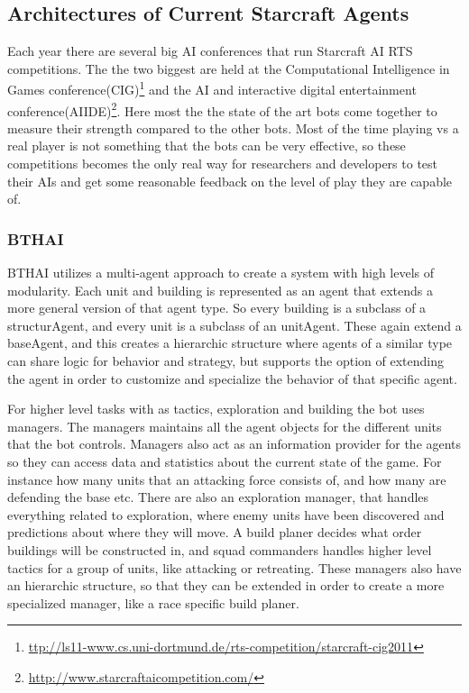 \subsection{Architectures of Current Starcraft Agents}
Each year there are several big AI conferences that run Starcraft AI RTS competitions. The the two biggest are held at the Computational Intelligence in Games conference(CIG)\footnote{\url{ttp://ls11-www.cs.uni-dortmund.de/rts-competition/starcraft-cig2011}} and the AI and interactive digital entertainment conference(AIIDE)\footnote{\url{http://www.starcraftaicompetition.com/}}. Here most the the state of the art bots come together to measure their strength compared to the other bots. Most of the time playing vs a real player is not something that the bots can be very effective, so these competitions becomes the only real way for researchers and developers to test their AIs and get some reasonable feedback on the level of play they are capable of.

\subsubsection{BTHAI}
BTHAI utilizes a multi-agent approach to create a system with high levels of modularity. Each unit and building is represented as an agent that extends a more general version of that agent type. So every building is a subclass of a structurAgent, and every unit is a subclass of an unitAgent. These again extend a baseAgent, and this creates a hierarchic structure where agents of a similar type can share logic for behavior and strategy, but supports the option of extending the agent in order to customize and specialize the behavior of that specific agent. 

For higher level tasks with as tactics, exploration and building the bot uses managers. The managers maintains all the agent objects for the different units that the bot controls. Managers also act as an information provider for the agents so they can access data and statistics about the current state of the game. For instance how many units that an attacking force consists of, and how many are defending the base etc. 
There are also an exploration manager, that handles everything related to exploration, where enemy units have been discovered and predictions about where they will move. A build planer decides what order buildings will be constructed in, and squad commanders handles higher level tactics for a group of units, like attacking or retreating. These managers also have an hierarchic structure, so that they can be extended in order to create a more specialized manager, like a race specific build planer. 

